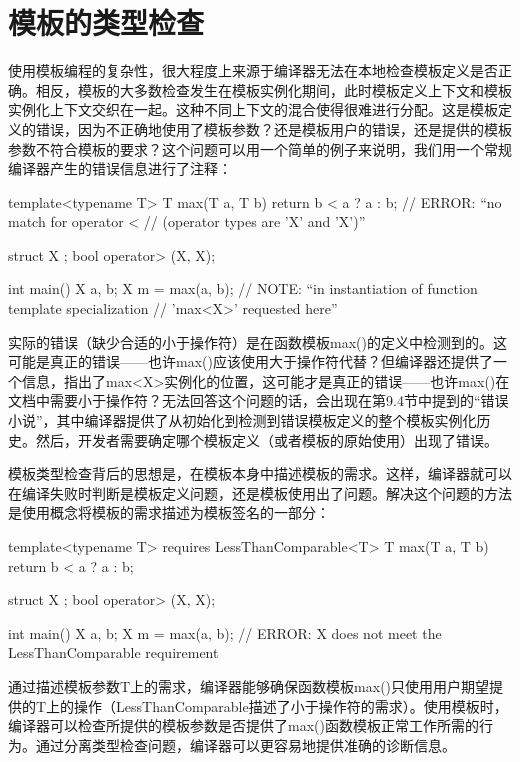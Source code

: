 \section{模板的类型检查}

使用模板编程的复杂性，很大程度上来源于编译器无法在本地检查模板定义是否正确。相反，模板的大多数检查发生在模板实例化期间，此时模板定义上下文和模板实例化上下文交织在一起。这种不同上下文的混合使得很难进行分配。这是模板定义的错误，因为不正确地使用了模板参数？还是模板用户的错误，还是提供的模板参数不符合模板的要求？这个问题可以用一个简单的例子来说明，我们用一个常规编译器产生的错误信息进行了注释：

\begin{cpp}
template<typename T>
T max(T a, T b) {
	return b < a ? a : b; // ERROR: “no match for operator <
	// (operator types are 'X' and 'X')”
}

struct X {};
bool operator> (X, X);

int main() {
	X a, b;
	X m = max(a, b); // NOTE: “in instantiation of function template specialization
					// 'max<X>' requested here”
}
\end{cpp}

实际的错误（缺少合适的小于操作符）是在函数模板max()的定义中检测到的。这可能是真正的错误——也许max()应该使用大于操作符代替？但编译器还提供了一个信息，指出了max<X>实例化的位置，这可能才是真正的错误——也许max()在文档中需要小于操作符？无法回答这个问题的话，会出现在第9.4节中提到的“错误小说”，其中编译器提供了从初始化到检测到错误模板定义的整个模板实例化历史。然后，开发者需要确定哪个模板定义（或者模板的原始使用）出现了错误。

模板类型检查背后的思想是，在模板本身中描述模板的需求。这样，编译器就可以在编译失败时判断是模板定义问题，还是模板使用出了问题。解决这个问题的方法是使用概念将模板的需求描述为模板签名的一部分：

\begin{cpp}
template<typename T> requires LessThanComparable<T>
T max(T a, T b) {
	return b < a ? a : b;
}

struct X { };
bool operator> (X, X);

int main() {
	X a, b;
	X m = max(a, b); // ERROR: X does not meet the LessThanComparable requirement
}
\end{cpp}

通过描述模板参数T上的需求，编译器能够确保函数模板max()只使用用户期望提供的T上的操作（LessThanComparable描述了小于操作符的需求）。使用模板时，编译器可以检查所提供的模板参数是否提供了max()函数模板正常工作所需的行为。通过分离类型检查问题，编译器可以更容易地提供准确的诊断信息。

